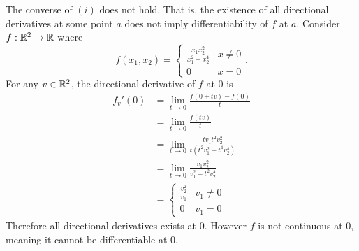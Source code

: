 \documentclass[../main.tex]{subfiles}
\begin{document}
\begin{remark}
    The converse of $(i)$ does not hold. That is, the existence of all directional derivatives at some point $a$ does not imply differentiability of $f$ at $a$. Consider $f : \mathbb{R}^2 \to \mathbb{R}$ where
    \[
        f(x_1,x_2) = \begin{cases}
            \frac{x_1 x_2^2}{x_1^2 + x_2^4} & x \neq 0 \\
            0                               & x = 0
        \end{cases}
    .\]
    For any $v \in \mathbb{R}^2$, the directional derivative of $f$ at $0$ is
    \begin{align*}
        f_v'(0) &= \lim_{t \to 0} \frac{f(0 + tv) - f(0)}{t} \\
        &= \lim_{t \to 0} \frac{f(tv)}{t} \\
        &= \lim_{t \to 0} \frac{t v_1 t^2 v_2^2}{t(t^2 v_1^2 + t^4 v_2^4)} \\
        &= \lim_{t \to 0} \frac{v_1 v_2^2}{v_1^2 + t^2 v_2^4} \\
        &= \begin{cases}
            \frac{v_2^2}{v_1} & v_1 \neq 0 \\
            0 & v_1 = 0
        \end{cases}
    \end{align*}
    Therefore all directional derivatives exists at $0$. However $f$ is not continuous at $0$, meaning it cannot be differentiable at $0$.
\end{remark}
\end{document}
